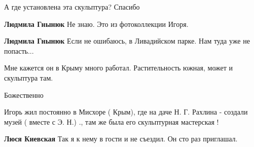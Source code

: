  
 
 
 
 

А где установлена эта скульптура?
Спасибо

\begin{itemize} %
\textbf{Людмила Гнынюк} Не знаю. Это из фотоколлекции Игоря.

\textbf{Людмила Гнынюк} Если не ошибаюсь, в Ливадийском парке. Нам туда уже не попасть...
\end{itemize} %

Мне кажется он в Крыму много работал. Растительность южная, может и скульптура там.

Божественно


Игорь жил постоянно в Мисхоре ( Крым), где на даче Н. Г. Рахлина - создали музей
( вместе с Э. Н.) ., там же была его скульптурная мастерская !

\textbf{Люся Киевская} Так я к нему в гости и не съездил. Он сто раз приглашал.
